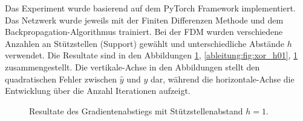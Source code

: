 Das Experiment wurde basierend auf dem PyTorch Framework implementiert.
%
Das Netzwerk wurde jeweils mit der Finiten Differenzen Methode und dem Backpropagation-Algorithmus trainiert.
Bei der FDM wurden verschiedene Anzahlen an Stützstellen (Support) gewählt und unterschiedliche Abstände $h$ verwendet.
Die Resultate sind in den Abbildungen \ref{ableitung:fig:xor_h1},
\ref{ableitung:fig:xor_h01}, \ref{ableitung:fig:xor_h1} zusammengestellt.
Die vertikale-Achse in den Abbildungen stellt den quadratischen Fehler zwischen $\hat{y}$ und $y$ dar, während die horizontale-Achse die Entwicklung über die Anzahl Iterationen aufzeigt.

\begin{figure}
	\caption{Resultate des Gradientenabstiegs mit Stützstellenabstand $h=1$.}
	\label{ableitung:fig:xor_h1}
\end{figure}


